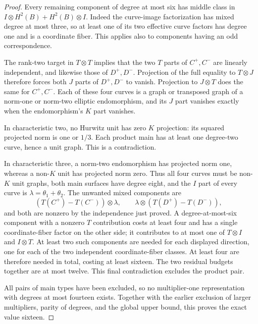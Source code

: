 \begin{proof}
Every remaining component of degree at most six has middle class in
$I\otimes H^2(B)+H^2(B)\otimes I$. Indeed the curve-image
factorization has mixed degree at most three, so at least one of its
two effective curve factors has degree one and is a coordinate fiber.
This applies also to components having an odd correspondence.

The rank-two target in $T\otimes T$ implies that the two $T$ parts of
$C^+,C^-$ are linearly independent, and likewise those of $D^+,D^-$.
Projection of the full equality to $T\otimes J$ therefore forces
both $J$ parts of $D^+,D^-$ to vanish. Projection to $J\otimes T$
does the same for $C^+,C^-$. Each of these four curves is a graph or
transposed graph of a norm-one or norm-two elliptic endomorphism,
and its $J$ part vanishes exactly when the endomorphism's $K$ part
vanishes.

In characteristic two, no Hurwitz unit has zero $K$ projection:
its squared projected norm is one or $1/3$. Each product main has at
least one degree-two curve, hence a unit graph. This is a contradiction.

In characteristic three, a norm-two endomorphism has projected norm
one, whereas a non-$K$ unit has projected norm zero. Thus all four
curves must be non-$K$ unit graphs, both main surfaces have degree
eight, and the $I$ part of every curve is
$\lambda=\theta_1+\theta_2$. The unwanted mixed components are
\[
 (T(C^+)-T(C^-))\otimes\lambda,
 \qquad \lambda\otimes(T(D^+)-T(D^-)),
\]
and both are nonzero by the independence just proved. A degree-at-most-six
component with a nonzero $T$ contribution costs at least four and
has a single coordinate-fiber factor on the other side; it contributes
to at most one of $T\otimes I$ and $I\otimes T$. At least two
such components are needed for each displayed direction, one for
each of the two independent coordinate-fiber classes. At least four
are therefore needed in total, costing at least sixteen. The two
residual budgets together are at most twelve. This final contradiction
excludes the product pair.

All pairs of main types have been excluded, so no multiplier-one
representation with degrees at most fourteen exists. Together with
the earlier exclusion of larger multipliers, parity of degrees, and
the global upper bound, this proves the exact value sixteen.
\end{proof}
